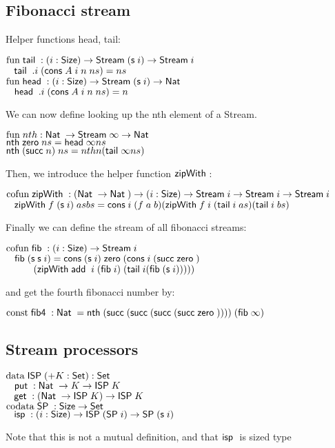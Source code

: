 \subsection{Fibonacci stream}

Helper functions head, tail:
\begin{bsp}
$\fun \tail : \EPi{i}{\Size}\Stream (\s i) \ra \Stream i$\\
$\spc \tail \; .i \; (\cons A \; i \; n \; ns) = ns$\\
$\fun \head : \EPi{i}{\Size}\Stream (\s i) \ra \Nat$\\
$\spc \head \; .i \; (\cons A \; i \; n \; ns) = n$
\end{bsp}
We can now define looking up the nth element of a Stream.
\begin{bsp}
$\fun nth : \Nat \ra \Stream \infty \ra \Nat$\\
$\nth \zero ns = \head \infty ns$\\
$\nth (\suc n) \; ns = nth n (\tail \infty ns)$\\
\end{bsp}
Then, we introduce the helper function $\zipWith$:
\begin{bsp}
$\cofun \zipWith : (\Nat \ra \Nat ) \ra \EPi{i}{\Size}{\Stream i \ra \Stream i \ra \Stream i}$ \\
$\spc \zipWith f \; (\s i) \; as bs = \cons i \; (f \; a \; b) (\zipWith f \; i \; (\tail i \; as) (\tail i \; bs)$
\end{bsp}
Finally we can define the stream of all fibonacci streams:
\begin{bsp}
$\cofun \fib : \EPi{i}{\Size}\Stream i$\\
$\spc \fib (\s \s i) = \cons (\s i) \; \zero (\cons i \; (\suc \zero)$\\
$\spcx (\zipWith \add \; i \; (\fib i) \; (\tail i (\fib (\s i)))))$
\end{bsp}
and get the fourth fibonacci number by:
\begin{bsp}
$\const \fibf : \Nat = \nth (\suc (\suc (\suc (\suc \zero )))) \; (\fib \infty)$
\end{bsp}
\subsection{Stream processors}

\begin{bsp}
$\data \ispd (+ K : \Set ) : \Set$\\
$\spc\putd : \Nat \ra K \ra \ispd K$\\
$\spc \getd : (\Nat \ra \ispd K) \ra \ispd K$\\ 
$\codata \spd : \Size \ra \Set$\\
$\spc \isp : (i : \Size ) \ra \ispd (\spd i) \ra \spd (\s i)$\\
\end{bsp}
Note that this is not a mutual definition, and that $\isp$ is sized type

